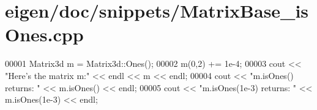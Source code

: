 \hypertarget{eigen_2doc_2snippets_2_matrix_base__is_ones_8cpp_source}{}\section{eigen/doc/snippets/\+Matrix\+Base\+\_\+is\+Ones.cpp}
\label{eigen_2doc_2snippets_2_matrix_base__is_ones_8cpp_source}

\begin{DoxyCode}
00001 Matrix3d m = Matrix3d::Ones();
00002 m(0,2) += 1e-4;
00003 cout << \textcolor{stringliteral}{"Here's the matrix m:"} << endl << m << endl;
00004 cout << \textcolor{stringliteral}{"m.isOnes() returns: "} << m.isOnes() << endl;
00005 cout << \textcolor{stringliteral}{"m.isOnes(1e-3) returns: "} << m.isOnes(1e-3) << endl;
\end{DoxyCode}

